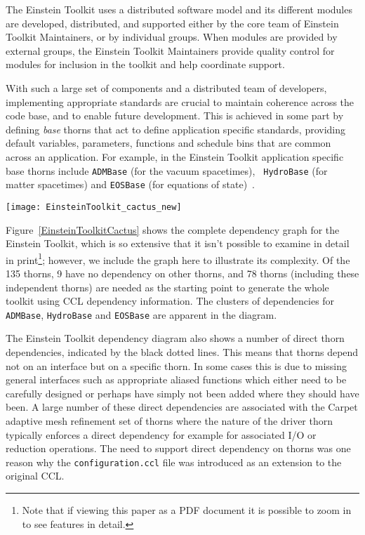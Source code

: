 \documentclass[conference]{IEEEtran}
\begin{document}
The Einstein Toolkit uses a distributed software model and its different modules are developed, 
distributed, and supported either by the core team of Einstein Toolkit Maintainers, or by individual 
groups. When modules are provided by external groups, the Einstein Toolkit Maintainers provide 
quality control for modules for inclusion in the toolkit and help coordinate support. 

With such a large set of components and a distributed team of developers, implementing appropriate standards are crucial to maintain coherence across 
the code base, and to enable future development. This is achieved in some part by defining {\it base} 
thorns that act to define application specific standards, providing default variables, parameters, 
functions and schedule bins that are common across an application. For example, in the Einstein 
Toolkit application specific base thorns include {\tt ADMBase} (for the vacuum spacetimes), {\tt 
HydroBase} (for matter spacetimes) and {\tt EOSBase} (for equations of state)~\cite{1456196}. 


\begin{figure*}[t!]
\centering
\texttt{[image: EinsteinToolkit\_cactus\_new]}
\label{EinsteinToolkitCactus}
\caption{Complete dependency graph for the {\tt 135} thorns of the EinsteinToolkit (\url{http://www.einsteintoolkit.org})}
\end{figure*}

Figure~\ref{EinsteinToolkitCactus} shows the complete dependency graph for the Einstein Toolkit, 
which is so extensive that it isn't possible to examine in detail in print\footnote{Note that if viewing this paper as a PDF document it is possible to zoom in to see features in detail.}; however, we include the 
graph here to illustrate its complexity. Of the 135 thorns, 9 have no dependency on other thorns, and 78 thorns (including these independent 
thorns) are needed as the starting point to generate the whole toolkit using CCL dependency 
information. The clusters of dependencies for {\tt ADMBase}, {\tt HydroBase} and {\tt EOSBase} are 
apparent in the diagram. 

The Einstein Toolkit dependency diagram also shows a number of direct thorn dependencies, indicated by the black dotted lines. This means that
thorns depend not on an interface but on a specific thorn. In some cases this is due to missing general interfaces such as appropriate aliased functions which either need to be carefully designed or perhaps have simply not been added where they should have been. A large number of these 
direct dependencies are associated with the Carpet adaptive mesh refinement set of thorns where the nature of the driver thorn typically enforces 
a direct dependency for example for associated I/O or reduction operations. The need to support direct dependency on thorns was one reason why the
{\tt configuration.ccl} file was introduced as an extension to the original CCL.
\end{document}

